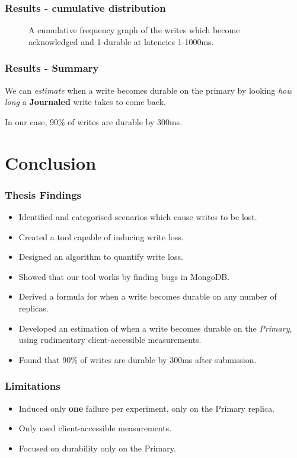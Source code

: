 \documentclass[numfooter,sectionpages,protectFrameTitle, progressbar, cblock, valigncolumns, addlogo]{beamer}
\begin{document}
\begin{frame}
    \frametitle{Results - cumulative distribution}

    \begin{figure}
        \centering        
        \scalebox{.5}{}
        \caption{A cumulative frequency graph of the writes which become acknowledged and 1-durable at latencies 1-1000ms.}
    \end{figure}

\end{frame}

\begin{frame}
    \frametitle{Results - Summary}

    We can \textit{estimate} when a write becomes durable on the primary by looking \textit{how long} a \textbf{Journaled} write takes to come back.

    In our case, 90\% of writes are durable by 300ms.
\end{frame}


\section{Conclusion}

\begin{frame}
    \frametitle{Thesis Findings}

    \begin{itemize}
        \item Identified and categorised scenarios which cause writes to be lost.
        \item Created a tool capable of inducing write loss.
        \item Designed an algorithm to quantify write loss.
        \item Showed that our tool works by finding bugs in MongoDB.
        \item Derived a formula for when a write becomes durable on any number of replicas.
        \item Developed an estimation of when a write becomes durable on the \textit{Primary}, using rudimentary client-accessible measurements. 
        \item Found that 90\% of writes are durable by 300ms after submission.
    \end{itemize}

\end{frame}

\begin{frame}
    \frametitle{Limitations}

    \begin{itemize}
        \item Induced only \textbf{one} failure per experiment, only on the Primary replica.
        \item Only used client-accessible measurements.
        \item Focused on durability only on the Primary.
    \end{itemize}
\end{frame}
\end{document}
